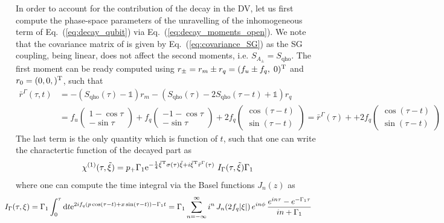 \documentclass[%
reprint,
superscriptaddress,
nofootinbib,
 amsmath,amssymb,
prx,
floatfix,
]{revtex4-2}
\begin{document}
In order to account for the contribution of the decay in the DV, let us first compute the phase-space parameters of the unravelling of the inhomogeneous term of Eq.~(\ref{eq:decay_qubit}) via Eq.~(\ref{eq:decay_moments_open}). We note that the covariance matrix of is given by Eq.~(\ref{eq:covariance_SG}) as the SG coupling, being linear, does not affect the second moments, i.e. $S_{A_\pm} = S_{\text{qho}}$. The first moment can be ready computed using $r_\pm = r_m \pm r_q = (f_u \pm f_q,\;0)^{\rm T}$ and $r_0 = (0,0,)^{\rm T}$, such that
\begin{align}
    \bar{r}^{\Gamma}(\tau, t) 
    &= -  \left( S_{\text{qho}}(\tau)  - \mathds{1}  \right) r_m -  \left( S_{\text{qho}}(\tau) -  2 S_{\text{qho}}(\tau - t) + \mathds{1}  \right) r_q \\
    &= f_u \begin{pmatrix}
1 - \cos \tau  \\
   - \sin \tau  
\end{pmatrix} + f_q \begin{pmatrix}
-1 - \cos \tau  \\
  - \sin \tau  
\end{pmatrix} + 2 f_q \begin{pmatrix}
 \cos ( \tau  - t) \\
   \sin (\tau-t)  
\end{pmatrix} =  \bar{r}^{\Gamma}(\tau) ++ 2 f_q \begin{pmatrix}
 \cos ( \tau  - t) \\
   \sin (\tau-t)  
\end{pmatrix}
\end{align}
The last term is the only quantity which is function of $t$, such that one can write the charactertic function of the decayed part as
\begin{equation}
    \chi^{(1) } (\tau, \tilde{\xi})  = p_+ \Gamma_1  {\rm e}^{-\frac{1}{4} \tilde{\xi}^{\rm T} \sigma (\tau) \tilde{\xi}  +  i  \tilde{\xi}^{\rm T} \bar{r}^{\Gamma} ( \tau ) }  \ I_\Gamma (\tau, \tilde{\xi}) \Gamma_1
\end{equation}
where 
one can compute the time integral via the Basel functions $J_{n}(z)$ as 
\begin{align}
\label{eq:I_bessel_series}
    \hspace{-0.5cm}I_\Gamma (\tau, \xi ) &=  \Gamma_1  \int_0^{\tau}  {\rm d} t {\rm e}^{ 2 i f_q \left(  p \cos(\tau - t) + x \sin(\tau - t)  \right)  - \Gamma_1 t } = \Gamma_1 \sum_{n=-\infty}^{\infty} i^n \, J_n(2 f_q |\xi| ) \, e^{i n\phi} \,
\frac{e^{in\tau} - e^{-\Gamma_1\tau}}{i n + \Gamma_1}  \nonumber
\end{align}
\end{document}
